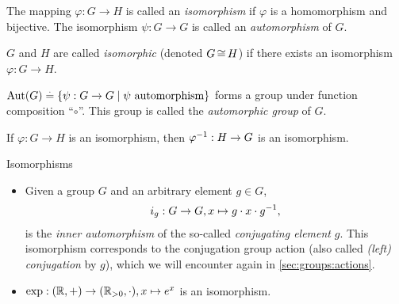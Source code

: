 \begin{defn}[Isomorphism]
\leavevmode\begin{defnlist}
    \item The mapping $\varphi : G \to H$ is called an \emph{isomorphism} if $\varphi$ is a homomorphism and bijective. The isomorphism $\psi : G \to G$ is called an \emph{automorphism} of $G$.
    \item $G$ and $H$ are called \emph{isomorphic} (denoted $G \operatorname*{\cong} H$) if there exists an isomorphism $\varphi : G \to H$.
    \item $\mathrm{Aut}(G) \overset{.}{=} \{\psi : G \to G \mid \text{$\psi$ automorphism}\}$ forms a group under function composition ``$\circ$''. This group is called the \emph{automorphic group} of $G$.
\end{defnlist}
\end{defn}

\begin{rmk}
If $\varphi : G \to H$ is an isomorphism, then $\varphi^{-1} : H \to G$ is an isomorphism.
\end{rmk}

\begin{ex}{Isomorphisms}{}
\begin{itemize}
    \item Given a group $G$ and an arbitrary element $g \in G$, \begin{align}
        i_g : G \to G, x \mapsto g \cdot x \cdot g^{-1},
    \end{align} is the \emph{inner automorphism} of the so-called \emph{conjugating element} $g$. This isomorphism corresponds to the conjugation group action (also called \emph{(left) conjugation} by $g$), which we will encounter again in \cref{sec:groups:actions}.
    
    \item $\exp : (\mathbb{R},+) \to (\mathbb{R}_{>0},\cdot), x \mapsto e^x$ is an isomorphism.
\end{itemize}
\end{ex}